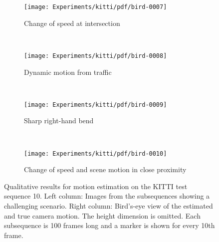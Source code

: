 		\begin{figure}[h]
			\centering
			\begin{subfigure}[t]{\linewidth}
				\centering
				\texttt{[image: Experiments/kitti/pdf/bird-0007]}
				\caption{
					Change of speed at intersection
					\label{fig:kitti-qualitative-speed-change}
				}
			\end{subfigure}%
			\\
			\begin{subfigure}[b]{\linewidth}
				\centering
				\texttt{[image: Experiments/kitti/pdf/bird-0008]}
				\caption{
					Dynamic motion from traffic
					\label{fig:kitti-qualitative-traffic-1}
				}
			\end{subfigure}%
			\\
			\begin{subfigure}[b]{\linewidth}
				\centering
				\texttt{[image: Experiments/kitti/pdf/bird-0009]}
				\caption{
					Sharp right-hand bend
					\label{fig:kitti-qualitative-sharp-turn}
				}
			\end{subfigure}%
			\\
			\begin{subfigure}[b]{\linewidth}
				\centering
								\texttt{[image: Experiments/kitti/pdf/bird-0010]}
				\caption{
					Change of speed and scene motion in close proximity
					\label{fig:kitti-qualitative-truck-close-up-stop}
				}
			\end{subfigure}%
			\caption[Qualitative results for motion estimation on KITTI]
					{Qualitative results for motion estimation on the KITTI test sequence 10.
					 Left column: Images from the subsequences showing a challenging scenario.
					 Right column: Bird's-eye view of the estimated and true camera motion.
					 The height dimension is omitted.
					 Each subsequence is 100 frames long and a marker is shown for every 10th frame.
					 \label{fig:kitti-qualitative-results-images-and-estimation}}
		\end{figure}